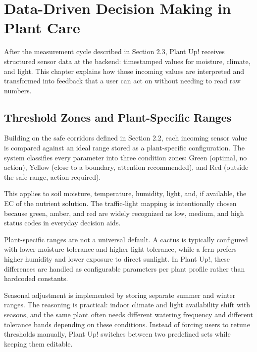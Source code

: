 ﻿\section{Data-Driven Decision Making in Plant Care}

After the measurement cycle described in Section 2.3, Plant Up! receives structured sensor data at the backend: timestamped values for moisture, climate, and light. This chapter explains how those incoming values are interpreted and transformed into feedback that a user can act on without needing to read raw numbers.

\subsection{Threshold Zones and Plant-Specific Ranges}

Building on the safe corridors defined in Section 2.2, each incoming sensor value is compared against an ideal range stored as a plant-specific configuration. The system classifies every parameter into three condition zones: Green (optimal, no action), Yellow (close to a boundary, attention recommended), and Red (outside the safe range, action required).

This applies to soil moisture, temperature, humidity, light, and, if available, the EC of the nutrient solution. The traffic-light mapping is intentionally chosen because green, amber, and red are widely recognized as low, medium, and high status codes in everyday decision aids.

Plant-specific ranges are not a universal default. A cactus is typically configured with lower moisture tolerance and higher light tolerance, while a fern prefers higher humidity and lower exposure to direct sunlight. In Plant Up!, these differences are handled as configurable parameters per plant profile rather than hardcoded constants.

Seasonal adjustment is implemented by storing separate summer and winter ranges. The reasoning is practical: indoor climate and light availability shift with seasons, and the same plant often needs different watering frequency and different tolerance bands depending on these conditions. Instead of forcing users to retune thresholds manually, Plant Up! switches between two predefined sets while keeping them editable.

